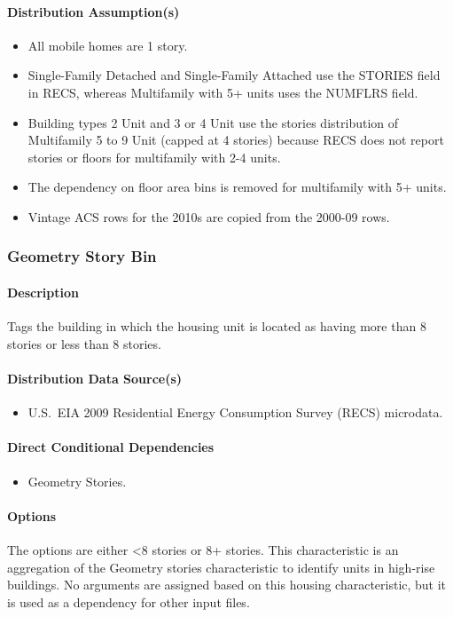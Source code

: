 \paragraph{Distribution Assumption(s)}
\begin{itemize}
    \item All mobile homes are 1 story.
    \item Single-Family Detached and Single-Family Attached use the STORIES field in RECS, whereas Multifamily with 5+ units uses the NUMFLRS field.
    \item Building types 2 Unit and 3 or 4 Unit use the stories distribution of Multifamily 5 to 9 Unit (capped at 4 stories) because RECS does not report stories or floors for multifamily with 2-4 units.
    \item The dependency on floor area bins is removed for multifamily with 5+ units.
    \item Vintage ACS rows for the 2010s are copied from the 2000-09 rows.
\end{itemize}

\subsubsection{Geometry Story Bin}
\paragraph{Description}
Tags the building in which the housing unit is located as having more than 8 stories or less than 8 stories.

\paragraph{Distribution Data Source(s)}
\begin{itemize}
    \item U.S.~EIA 2009 Residential Energy Consumption Survey (RECS) microdata.
\end{itemize}

\paragraph{Direct Conditional Dependencies}
\begin{itemize}
    \item Geometry Stories.
\end{itemize}

\paragraph{Options}
The options are either <8 stories or 8+ stories. This characteristic is an aggregation of the Geometry stories characteristic to identify units in high-rise buildings. No arguments are assigned based on this housing characteristic, but it is used as a dependency for other input files.

